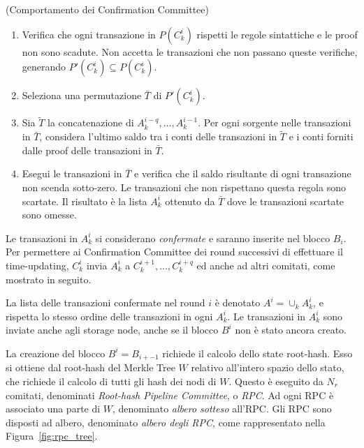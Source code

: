\begin{algo}{(Comportamento dei Confirmation Committee)}
\begin{enumerate}
	\item Verifica che ogni transazione in $P(C_k^i)$ rispetti le regole sintattiche e le proof non sono scadute. Non accetta le transazioni che non passano queste verifiche, generando $P'(C_k^i) \subseteq P(C_k^i)$.
	\item Seleziona una permutazione $\bar{T}$ di $P'(C_k^i)$.
	\item Sia $\widetilde{T}$ la concatenazione di $A_k^{i-q}, \dots, A_k^{i-1}$. Per ogni sorgente nelle transazioni in $\bar{T}$, considera l'ultimo saldo tra i conti delle transazioni in $\widetilde{T}$ e i conti forniti dalle proof delle transazioni in $\bar{T}$.
	\item Esegui le transazioni in $\bar{T}$ e verifica che il saldo risultante di ogni transazione non scenda sotto-zero. Le transazioni che non rispettano questa regola sono scartate. Il risultato è la lista $A_k^i$ ottenuto da $\bar{T}$ dove le transazioni scartate sono omesse.	
\end{enumerate}
\end{algo}

Le transazioni in $A_k^i$ si considerano \emph{confermate} e saranno inserite nel blocco $B_i$. Per permettere ai Confirmation Committee dei round successivi di effettuare il time-updating, $C_k^i$ invia $A_k^i$ a $C_k^{i+1}, \dots, C_k^{i+q}$ ed anche ad altri comitati, come mostrato in seguito.

La lista delle transazioni confermate nel round $i$ è denotato $A^i = \cup_k A_k^i$, e rispetta lo stesso ordine delle transazioni in ogni $A_k^i$. Le transazioni in $A_k^i$ sono inviate anche agli storage node, anche se il blocco $B^i$ non è stato ancora creato.

La creazione del blocco $B^i = B_{i+-1}$ richiede il calcolo dello state root-hash. Esso si ottiene dal root-hash del Merkle Tree $W$ relativo all'intero spazio dello stato, che richiede il calcolo di tutti gli hash dei nodi di $W$.
Questo è eseguito da $N_r$ comitati, denominati \emph{Root-hash Pipeline Committee}, o \emph{RPC}. Ad ogni RPC è associato una parte di $W$, denominato \emph{albero sotteso} all'RPC. Gli RPC sono disposti ad albero, denominato \emph{albero degli RPC}, come rappresentato nella Figura~\ref{fig:rpc_tree}.

